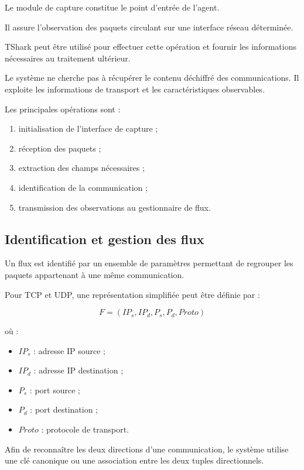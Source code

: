 Le module de capture constitue le point d'entrée
de l'agent.

Il assure l'observation des paquets circulant sur
une interface réseau déterminée.

TShark peut être utilisé pour effectuer cette opération
et fournir les informations nécessaires au traitement
ultérieur.

Le système ne cherche pas à récupérer le contenu
déchiffré des communications. Il exploite les informations
de transport et les caractéristiques observables.

Les principales opérations sont :

\begin{enumerate}
    \item initialisation de l'interface de capture ;
    \item réception des paquets ;
    \item extraction des champs nécessaires ;
    \item identification de la communication ;
    \item transmission des observations au gestionnaire
    de flux.
\end{enumerate}

\subsection{Identification et gestion des flux}

Un flux est identifié par un ensemble de paramètres
permettant de regrouper les paquets appartenant
à une même communication.

Pour TCP et UDP, une représentation simplifiée
peut être définie par :

\[
F=(IP_s,IP_d,P_s,P_d,Proto)
\]

où :

\begin{itemize}
    \item $IP_s$ : adresse IP source ;
    \item $IP_d$ : adresse IP destination ;
    \item $P_s$ : port source ;
    \item $P_d$ : port destination ;
    \item $Proto$ : protocole de transport.
\end{itemize}

Afin de reconnaître les deux directions d'une communication,
le système utilise une clé canonique ou une association
entre les deux tuples directionnels.

